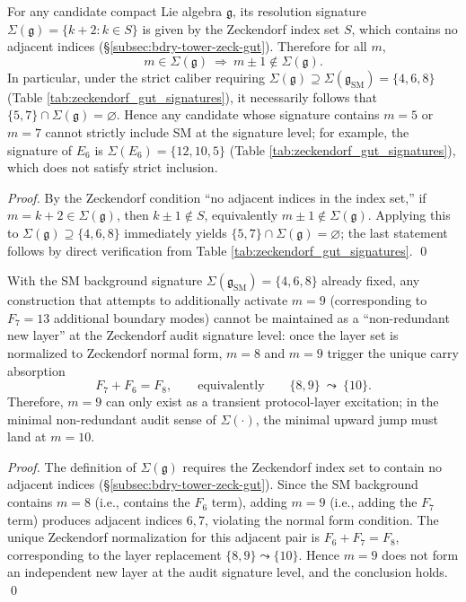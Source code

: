 \begin{corollary}\label{cor:zeckendorf-no-adjacent-strict-inclusion-impossible}
For any candidate compact Lie algebra \(\mathfrak g\), its resolution signature \(\Sigma(\mathfrak g)=\{k+2:k\in S\}\) is given by the Zeckendorf index set \(S\), which contains no adjacent indices (\S\ref{subsec:bdry-tower-zeck-gut}).
Therefore for all \(m\),
\[
m\in\Sigma(\mathfrak g)\ \Longrightarrow\ m\pm 1\notin\Sigma(\mathfrak g).
\]
In particular, under the strict caliber requiring
\(
\Sigma(\mathfrak g)\supseteq \Sigma(\mathfrak g_{\mathrm{SM}})=\{4,6,8\}
\)
(Table \ref{tab:zeckendorf_gut_signatures}), it necessarily follows that
\(
\{5,7\}\cap \Sigma(\mathfrak g)=\varnothing
\).
Hence any candidate whose signature contains \(m=5\) or \(m=7\) cannot strictly include SM at the signature level; for example, the signature of \(E_6\) is \(\Sigma(E_6)=\{12,10,5\}\) (Table \ref{tab:zeckendorf_gut_signatures}), which does not satisfy strict inclusion.
\end{corollary}
\begin{proof}
By the Zeckendorf condition ``no adjacent indices in the index set,'' if \(m=k+2\in\Sigma(\mathfrak g)\), then \(k\pm 1\notin S\), equivalently \(m\pm 1\notin \Sigma(\mathfrak g)\).
Applying this to \(\Sigma(\mathfrak g)\supseteq\{4,6,8\}\) immediately yields \(\{5,7\}\cap\Sigma(\mathfrak g)=\varnothing\); the last statement follows by direct verification from Table \ref{tab:zeckendorf_gut_signatures}. \qed
\end{proof}

\begin{corollary}[Separation of Protocol Excitation Layer and Audit Signature Layer: Carry Absorption at \texorpdfstring{$m=9$}{m=9}]\label{cor:zeckendorf-carry-absorption-m9}
With the SM background signature \(\Sigma(\mathfrak g_{\mathrm{SM}})=\{4,6,8\}\) already fixed,
any construction that attempts to additionally activate \(m=9\) (corresponding to \(F_7=13\) additional boundary modes) cannot be maintained as a ``non-redundant new layer'' at the Zeckendorf audit signature level:
once the layer set is normalized to Zeckendorf normal form, \(m=8\) and \(m=9\) trigger the unique carry absorption
\[
F_{7}+F_{6}=F_{8},
\qquad\text{equivalently}\qquad
\{8,9\}\ \leadsto\ \{10\}.
\]
Therefore, \(m=9\) can only exist as a transient protocol-layer excitation; in the minimal non-redundant audit sense of \(\Sigma(\cdot)\), the minimal upward jump must land at \(m=10\).
\end{corollary}
\begin{proof}
The definition of \(\Sigma(\mathfrak g)\) requires the Zeckendorf index set to contain no adjacent indices (\S\ref{subsec:bdry-tower-zeck-gut}).
Since the SM background contains \(m=8\) (i.e., contains the \(F_6\) term), adding \(m=9\) (i.e., adding the \(F_7\) term) produces adjacent indices \(6,7\), violating the normal form condition.
The unique Zeckendorf normalization for this adjacent pair is \(F_6+F_7=F_8\), corresponding to the layer replacement \(\{8,9\}\leadsto\{10\}\).
Hence \(m=9\) does not form an independent new layer at the audit signature level, and the conclusion holds. \qed
\end{proof}

